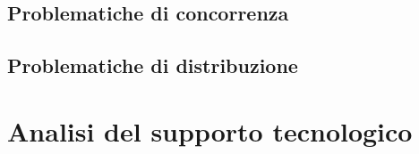 \documentclass[a4paper]{article}
\begin{document}
\subsection{Problematiche di concorrenza}

\subsection{Problematiche di distribuzione}


\section{Analisi del supporto tecnologico}

\appendix


\end{document}
